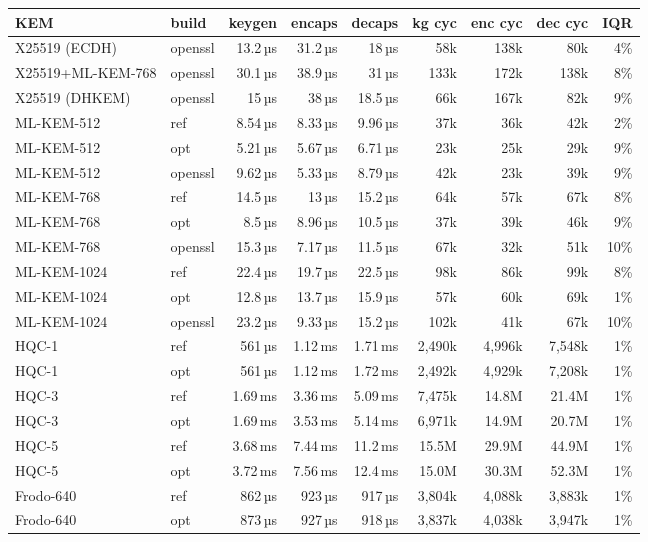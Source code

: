\begin{tabular}{llrrrrrrr}
\toprule
KEM & build & keygen & encaps & decaps & kg cyc & enc cyc & dec cyc & IQR \\
\midrule
X25519 (ECDH) & openssl & 13.2\,µs & 31.2\,µs & 18\,µs & 58k & 138k & 80k & 4\% \\
X25519+ML-KEM-768 & openssl & 30.1\,µs & 38.9\,µs & 31\,µs & 133k & 172k & 138k & 8\% \\
X25519 (DHKEM) & openssl & 15\,µs & 38\,µs & 18.5\,µs & 66k & 167k & 82k & 9\% \\
\midrule
ML-KEM-512 & ref & 8.54\,µs & 8.33\,µs & 9.96\,µs & 37k & 36k & 42k & 2\% \\
ML-KEM-512 & opt & 5.21\,µs & 5.67\,µs & 6.71\,µs & 23k & 25k & 29k & 9\% \\
ML-KEM-512 & openssl & 9.62\,µs & 5.33\,µs & 8.79\,µs & 42k & 23k & 39k & 9\% \\
ML-KEM-768 & ref & 14.5\,µs & 13\,µs & 15.2\,µs & 64k & 57k & 67k & 8\% \\
ML-KEM-768 & opt & 8.5\,µs & 8.96\,µs & 10.5\,µs & 37k & 39k & 46k & 9\% \\
ML-KEM-768 & openssl & 15.3\,µs & 7.17\,µs & 11.5\,µs & 67k & 32k & 51k & 10\% \\
ML-KEM-1024 & ref & 22.4\,µs & 19.7\,µs & 22.5\,µs & 98k & 86k & 99k & 8\% \\
ML-KEM-1024 & opt & 12.8\,µs & 13.7\,µs & 15.9\,µs & 57k & 60k & 69k & 1\% \\
ML-KEM-1024 & openssl & 23.2\,µs & 9.33\,µs & 15.2\,µs & 102k & 41k & 67k & 10\% \\
\midrule
HQC-1 & ref & 561\,µs & 1.12\,ms & 1.71\,ms & 2,490k & 4,996k & 7,548k & 1\% \\
HQC-1 & opt & 561\,µs & 1.12\,ms & 1.72\,ms & 2,492k & 4,929k & 7,208k & 1\% \\
HQC-3 & ref & 1.69\,ms & 3.36\,ms & 5.09\,ms & 7,475k & 14.8M & 21.4M & 1\% \\
HQC-3 & opt & 1.69\,ms & 3.53\,ms & 5.14\,ms & 6,971k & 14.9M & 20.7M & 1\% \\
HQC-5 & ref & 3.68\,ms & 7.44\,ms & 11.2\,ms & 15.5M & 29.9M & 44.9M & 1\% \\
HQC-5 & opt & 3.72\,ms & 7.56\,ms & 12.4\,ms & 15.0M & 30.3M & 52.3M & 1\% \\
\midrule
Frodo-640 & ref & 862\,µs & 923\,µs & 917\,µs & 3,804k & 4,088k & 3,883k & 1\% \\
Frodo-640 & opt & 873\,µs & 927\,µs & 918\,µs & 3,837k & 4,038k & 3,947k & 1\% \\

\end{tabular}
